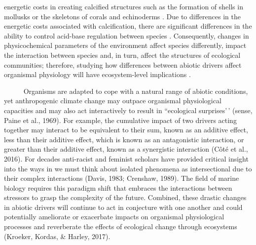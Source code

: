 \documentclass[
  12pt,
]{article}
\begin{document}
energetic costs in creating calcified structures such as the formation
of shells in mollusks or the skeletons of corals and echinoderms
\citep{doney2009ocean, spalding2017energetic}. Due to differences in the
energetic costs associated with calcification, there are significant
differences in the ability to control acid-base regulation between
species \citep{doney2009ocean}. Consequently, changes in physicochemical
parameters of the environment affect species differently, impact the
interaction between species and, in turn, affect the structures of
ecological communities; therefore, studying how differences between
abiotic drivers affect organismal physiology will have ecosystem-level
implications \citep{tomanek2002physiological, barclay2019variation}.

~~~~~ Organisms are adapted to cope with a natural range of abiotic
conditions, yet anthropogenic climate change may outpace organismal
physiological capacities and may also act interactively to result in
``ecological surprises'\,' (sense, Paine et al., 1969). For example, the
cumulative impact of two drivers acting together may interact to be
equivalent to their sum, known as an additive effect, less than their
additive effect, which is known as an antagonistic interaction, or
greater than their additive effect, known as a synergistic interaction
(Côté et al., 2016). For decades anti-racist and feminist scholars have
provided critical insight into the ways in we must think about isolated
phenomena as intersectional due to their complex interactions (Davis,
1983; Crenshaw, 1989). The field of marine biology requires this
paradigm shift that embraces the interactions between stressors to grasp
the complexity of the future. Combined, these drastic changes in abiotic
drivers will continue to act in conjecture with one another and could
potentially ameliorate or exacerbate impacts on organismal physiological
processes and reverberate the effects of ecological change through
ecosystems (Kroeker, Kordas, \& Harley, 2017).

\newpage
\end{document}

